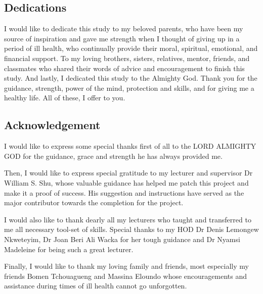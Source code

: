 \documentclass[a4paper,12pt, openany]{book}
\begin{document}
\newpage
\vspace*{0.25\textheight}
\begin{center}
	\section*{Dedications}
		\vspace*{.2in}
\end{center}

I would like to dedicate this study to my beloved parents, who have been my source of inspiration and gave me strength when I thought of giving up in a period of ill health, who continually provide their moral, spiritual, emotional, and financial support.\bigbreak
To my loving brothers, sisters, relatives, mentor, friends, and classmates who shared their words of advice and encouragement to finish this study.\bigbreak
And lastly, I dedicated this study to the Almighty God. Thank you for the guidance, strength, power of the mind, protection and skills, and for giving me a healthy life. All of these, I offer to you. 



\newpage
\vspace*{0.25\textheight}
\begin{center}
	\section*{Acknowledgement}     
	\vspace*{.3in}
                      \end{center}

I would like to express some special thanks first of all to the LORD ALMIGHTY GOD for the guidance, grace and strength he has always provided me.

Then, I would like to express special gratitude to my lecturer and supervisor Dr William S. Shu, whose valuable guidance has helped me patch this project and make it a proof of success. His suggestion and instructions have served as the major contributor towards the completion for the project. 

I would also like to thank dearly all my lecturers who taught and transferred to me all necessary tool-set of skills. Special thanks to my HOD Dr Denis Lemongew Nkweteyim, Dr Joan Beri Ali Wacka for her tough guidance and Dr Nyamsi Madeleine for being such a great lecturer.

Finally, I would like to thank my loving family and friends, most especially my friends Bomen Tchouagueng and Massina Eloundo whose encouragements and assistance during times of ill health cannot go unforgotten.  
\end{document}
